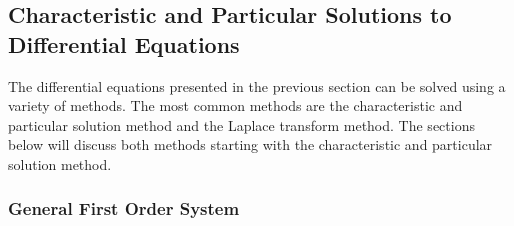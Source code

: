 \subsection{Characteristic and Particular Solutions to Differential Equations}

The differential equations presented in the previous section can be solved using a variety of methods. The most common methods are the characteristic and particular solution method and the Laplace transform method. The sections below will discuss both methods starting with the characteristic and particular solution method.

\subsubsection{General First Order System}


